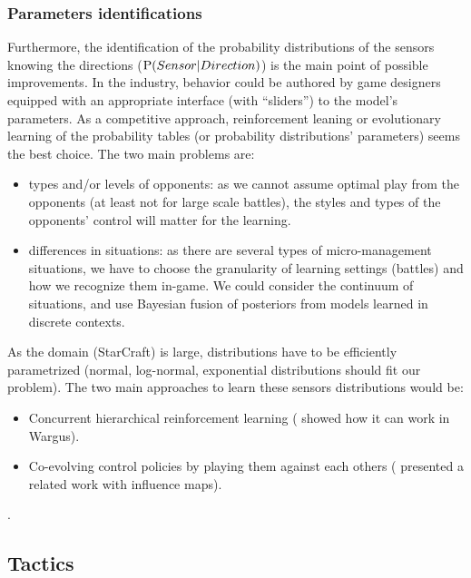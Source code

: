 \subsubsection{Parameters identifications}

Furthermore, the identification of the probability distributions of the sensors knowing the directions ($\mathrm{P}(Sensor|Direction)$) is the main point of possible improvements. In the industry, behavior could be authored by game designers equipped with an appropriate interface (with ``sliders'') to the model's parameters. As a competitive approach, reinforcement leaning or evolutionary learning of the probability tables (or probability distributions' parameters) seems the best choice. The two main problems are: 
\begin{itemize}
    \item types and/or levels of opponents: as we cannot assume optimal play from the opponents (at least not for large scale battles), the styles and types of the opponents' control will matter for the learning.
    \item differences in situations: as there are several types of micro-management situations, we have to choose the granularity of learning settings (battles) and how we recognize them in-game. We could consider the continuum of situations, and use Bayesian fusion of posteriors from models %
learned in discrete contexts.
\end{itemize}
As the domain (StarCraft) is large, distributions have to be efficiently parametrized (normal, log-normal, exponential distributions should fit our problem). The two main approaches to learn these sensors distributions would be:
\begin{itemize}
    \item Concurrent hierarchical reinforcement learning (\citep{Marthi05concurrenthierarchical} showed how it can work in Wargus).
        \item Co-evolving control policies by playing them against each others (\citep{Miles2007,Avery09} presented a related work with influence maps).
\end{itemize}.

\subsection{Tactics}

